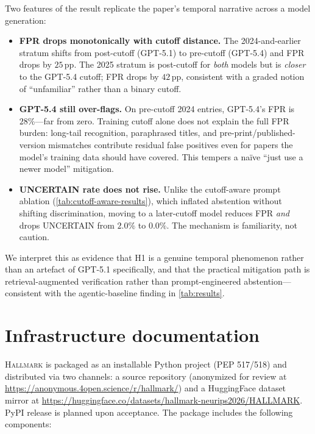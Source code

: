 Two features of the result replicate the paper's temporal narrative across a model generation:
\begin{itemize}
  \item \textbf{FPR drops monotonically with cutoff distance.} The 2024-and-earlier stratum shifts from post-cutoff (GPT-5.1) to pre-cutoff (GPT-5.4) and FPR drops by $25$\,pp. The 2025 stratum is post-cutoff for \emph{both} models but is \emph{closer} to the GPT-5.4 cutoff; FPR drops by $42$\,pp, consistent with a graded notion of ``unfamiliar'' rather than a binary cutoff.
  \item \textbf{GPT-5.4 still over-flags.} On pre-cutoff 2024 entries, GPT-5.4's FPR is $28\%$---far from zero. Training cutoff alone does not explain the full FPR burden: long-tail recognition, paraphrased titles, and pre-print/published-version mismatches contribute residual false positives even for papers the model's training data should have covered. This tempers a naïve ``just use a newer model'' mitigation.
  \item \textbf{UNCERTAIN rate does not rise.} Unlike the cutoff-aware prompt ablation (\cref{tab:cutoff-aware-results}), which inflated abstention without shifting discrimination, moving to a later-cutoff model reduces FPR \emph{and} drops UNCERTAIN from $2.0\%$ to $0.0\%$. The mechanism is familiarity, not caution.
\end{itemize}

We interpret this as evidence that H1 is a genuine temporal phenomenon rather than an artefact of GPT-5.1 specifically, and that the practical mitigation path is retrieval-augmented verification rather than prompt-engineered abstention---consistent with the agentic-baseline finding in \cref{tab:results}.

\section{Infrastructure documentation}
\label{app:infrastructure}

\textsc{Hallmark} is packaged as an installable Python project (PEP 517/518) and distributed via two channels: a source repository (anonymized for review at \url{https://anonymous.4open.science/r/hallmark/}) and a HuggingFace dataset mirror at \url{https://huggingface.co/datasets/hallmark-neurips2026/HALLMARK}. PyPI release is planned upon acceptance. The package includes the following components:

